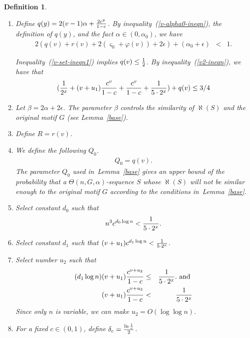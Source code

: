 \documentclass[11pt]{article}
\newtheorem{dfntn}[theoremfoo]{Definition}
\newenvironment{definition}{\pagebreak[1]\begin{dfntn}\rm}{\end{dfntn}}
\begin{document}
\begin{definition}
\begin{enumerate}
\item
Define $q(y)=2(v-1)\alpha+{2c^y\over 1-c}$. By inequality~(\ref{v-alpha0-ineqn}), the definition of $q(y)$, and
the fact $\alpha\in (0,\alpha_0)$, we have
\begin{eqnarray}
2(q(v)+r(v)+2(\varsigma_0+\varphi(v))+2\epsilon)+(\alpha_0+\epsilon)&<&1.\label{v-set-ineqn1}
\end{eqnarray}

Inequality~(\ref{v-set-ineqn1}) implies $q(v)\le {1\over 2}$. By
inequality~(\ref{v2-ineqn}), we have that
\begin{eqnarray}
 ({1\over 2^x}+(v+u_1){c^{v}\over
1-c}+{c^v\over 1-c}+{1\over 5\cdot 2^x})+q(v)\le
{3/4}\label{support-P0-Q0-inequality}
\end{eqnarray}



\item\label{beta-def}
 Let
$\beta=2\alpha+2\epsilon$. The parameter $\beta$ controls the
similarity of $\aleph(S)$ and the original motif $G$ (see
Lemma~\ref{base}).

\item
Define $R=r(v)$.




\item
We define the following $Q_0$. \begin{eqnarray}
 Q_0=q(v).\label{Q0-def-eqn}
\end{eqnarray}
The parameter $Q_0$ used in~Lemma~\ref{base} gives an upper  bound
of the probability that a $\Theta(n,G,\alpha)$-sequence $S$ whose
$\aleph(S)$ will not be similar enough to the original motif $G$
according to the conditions in~Lemma~\ref{base}.


\item
Select constant $d_0$ such that
\begin{eqnarray}
n^3c^{d_0\log n}<{1\over 5\cdot 2^x}.\label{d0-sel-eqn}
\end{eqnarray}




\item
Select constant $d_1$ such that $(v+u_1)c^{d_1\log n}<{1\over 5\cdot
2^x}$.

\item
Select number $u_2$ such that
\begin{eqnarray}
(d_1\log n)(v+u_1){c^{v+u_2}\over 1-c}&\le& {1\over 5\cdot 2^x}.\ {\rm and} \ \\
(v+u_1){c^{v+u_2}\over 1-c}&<&{1\over 5\cdot 2^x}
\end{eqnarray}
Since only $n$ is variable, we can make $u_2=O(\log\log n)$.





\item
For a fixed $c\in (0,1)$, define $\delta_c={\ln{1\over c}\over 2}$.
\end{enumerate}
\end{definition}
\end{document}
